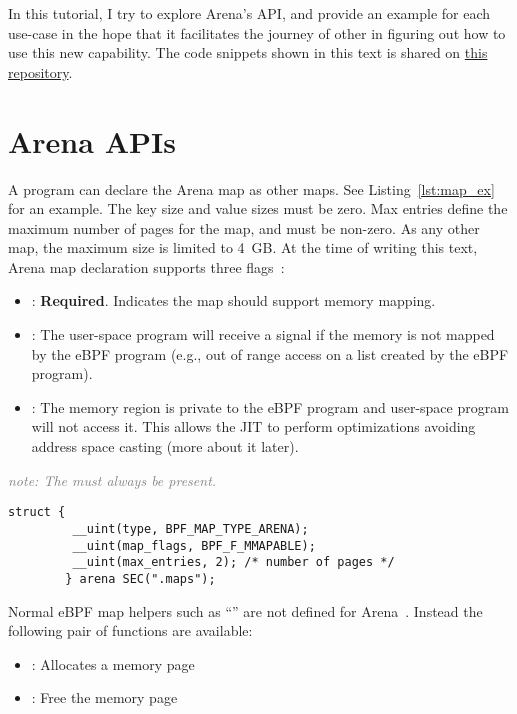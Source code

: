 \documentclass{article}
\begin{document}
In this tutorial, I try to explore Arena's API, and provide an example for each
use-case in the hope that it facilitates the journey of other in figuring out
how to use this new capability. The code snippets shown in this text is shared
on \href{https://github.com/bpf-endeavor/ebpf-arena-tutorial}{this repository}.

\section{Arena APIs}

A program can declare the Arena map as other maps. See Listing~\ref{lst:map_ex}
for an example. The key size and value sizes must be zero. Max entries define
the maximum number of pages for the map, and must be non-zero. As any other
map, the maximum size is limited to 4~GB. At the time of writing this text,
Arena map declaration supports three flags~\cite{arena_source}:
\begin{itemize}
    \item {}: \textbf{Required}. Indicates the map should
        support memory mapping.
    \item {}: The user-space program will receive a
         signal if the memory is not mapped by the eBPF program
        (e.g., out of range access on a list created by the eBPF program).
    \item {}: The memory region is private to the eBPF
        program and user-space program will not access it. This allows the JIT
        to perform optimizations avoiding address space casting (more about it
        later).
\end{itemize}
\textcolor{gray}{\textit{note: The  must always be present.}}

\begin{minipage}{\linewidth}
    \centering
    \begin{flushleft}
        \begin{lstlisting}[caption={Example of using Arena map}, label={lst:map_ex}]
        struct {
         __uint(type, BPF_MAP_TYPE_ARENA);
         __uint(map_flags, BPF_F_MMAPABLE);
         __uint(max_entries, 2); /* number of pages */
        } arena SEC(".maps");
        \end{lstlisting}
    \end{flushleft}
\end{minipage}

Normal eBPF map helpers such as ``'' are not
defined for Arena~\cite{arena_source}. Instead the following pair of functions
are available:
\begin{itemize}
    \item {}: Allocates a memory page
    \item {}: Free the memory page
\end{itemize}
\end{document}
